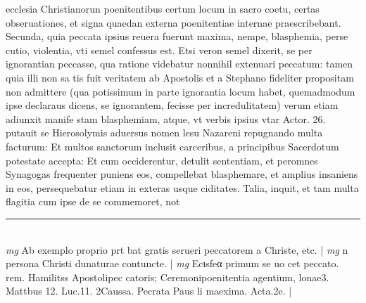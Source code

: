\documentclass{article}
\begin{document}
\begin{pages}
ecclesia Christianorun poenitentibus certum locum in sacro coetu, certas obseruationes, et signa quaedan externa poenitentiae internae praescribebant.  \pend\pstart Secunda, quia peccata ipsius reuera fuerunt maxima, nempe, blasphemia, perse cutio, violentia, vti semel confessus est. Etsi veron semel dixerit, se per ignorantian peccasse, qua ratione videbatur nonnihil extenuari peccatum: tamen quia illi non sa tis fuit veritatem ab Apostolis et a Stephano fideliter propositam non admittere (qua potissimum in parte ignorantia locum habet, quemadmodum ipse declaraus dicens, se ignorantem, fecisse per incredulitatem) verum etiam adiunxit manife stam blasphemiam, atque, vt verbis ipsius vtar Actor. 26. putauit se Hierosolymis aduersus nomen lesu Nazareni repugnando multa facturum: Et multos sanctorum inclusit carceribus, a principibus Sacerdotum potestate accepta: Et cum occiderentur, detulit sententiam, et peromnes Synagogas frequenter puniens eos, compellebat blasphemare, et amplius insaniens in eos, persequebatur etiam in exteras usque ciditates. Talia, inquit, et tam multa flagitia cum ipse de se commemoret, not\pend
\vspace{0.5cm}\noindent
\vspace{0.2cm}\rule{1cm}{0.2pt}\\ 
\hspace{0.2cm}\textit{mg}
\footnotesize Ab exemplo proprio prt bat gratis serueri peccatorem a Christe, etc. 
\normalsize| 
\hspace{0.2cm}\textit{mg}
\footnotesize n persona Christi dunaturae contuncte. 
\normalsize| 
\hspace{0.2cm}\textit{mg}
\footnotesize Ecιsfeα primum se uo cet peccato. rem. Hamilitss Apostolipec catoris; Ceremonipoenitentia agentium, lonae3. Mattbus 12. Luc.11. 2Caussa. Pecrata Paus li maexima. Acta.2e. 
\normalsize| 

\end{pages}
\end{document}

